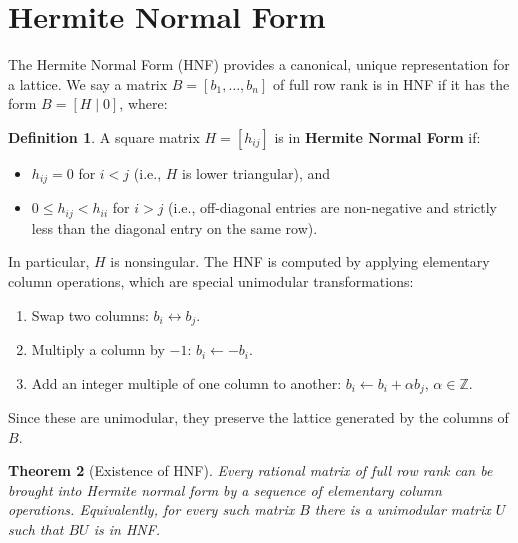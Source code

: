 \documentclass[11pt]{article}
\theoremstyle{plain}
\newtheorem{theorem}{Theorem}[section]
\theoremstyle{definition}
\newtheorem{definition}[theorem]{Definition}
\newcommand{\Z}{\mathbb{Z}}
\begin{document}
\section{Hermite Normal Form}

The Hermite Normal Form (HNF) provides a canonical, unique representation for a lattice. We say a matrix $B = [b_1,\ldots,b_n]$ of full row rank is in HNF if it has the form $B = [H \mid 0]$, where:

\begin{definition}
A square matrix $H = [h_{ij}]$ is in \textbf{Hermite Normal Form} if:
\begin{itemize}
  \item $h_{ij} = 0$ for $i < j$ \quad (i.e., $H$ is lower triangular), and
  \item $0 \le h_{ij} < h_{ii}$ for $i > j$ \quad (i.e., off-diagonal entries are non-negative and strictly less than the diagonal entry on the same row).
\end{itemize}
\end{definition}

In particular, $H$ is nonsingular. The HNF is computed by applying elementary column operations, which are special unimodular transformations:
\begin{enumerate}
  \item Swap two columns: $b_i \leftrightarrow b_j$.
  \item Multiply a column by $-1$: $b_i \leftarrow -b_i$.
  \item Add an integer multiple of one column to another: $b_i \leftarrow b_i + \alpha b_j$, $\alpha \in \Z$.
\end{enumerate}
Since these are unimodular, they preserve the lattice generated by the columns of $B$.

\begin{theorem}[Existence of HNF]
Every rational matrix of full row rank can be brought into Hermite normal form by a sequence of elementary column operations. Equivalently, for every such matrix $B$ there is a unimodular matrix $U$ such that $BU$ is in HNF.
\end{theorem}
\end{document}
